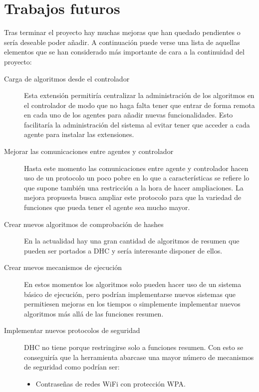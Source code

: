 \chapter{Trabajos futuros}\label{cap6}

Tras terminar el proyecto hay muchas mejoras que han quedado pendientes o sería deseable poder añadir. A continuación puede verse una lista de aquellas elementos que se han considerado más importante de cara a la continuidad del proyecto:

\begin{description}
	\item[Carga de algoritmos desde el controlador] Esta extensión permitiría centralizar la administración de los algoritmos en el controlador de modo que no haga falta tener que entrar de forma remota en cada uno de los agentes para añadir nuevas funcionalidades. Esto facilitaría la administración del sistema al evitar tener que acceder a cada agente para instalar las extensiones.

	\item[Mejorar las comunicaciones entre agentes y controlador] Hasta este momento las comunicaciones entre agente y controlador hacen uso de un protocolo un poco pobre en lo que a características se refiere lo que supone también una restricción a la hora de hacer ampliaciones. La mejora propuesta busca ampliar este protocolo para que la variedad de funciones que pueda tener el agente sea mucho mayor.

	\item[Crear nuevos algoritmos de comprobación de hashes] En la actualidad hay una gran cantidad de algoritmos de resumen que pueden ser portados a  DHC y sería interesante disponer de ellos.
	
	\item[Crear nuevos mecanismos de ejecución] En estos momentos los algoritmos solo pueden hacer uso de un sistema básico de ejecución, pero podrían implementarse nuevos sistemas que permitiesen mejoras en los tiempos o simplemente implementar nuevos algoritmos más allá de las funciones resumen.
	
	\item[Implementar nuevos protocolos de seguridad] DHC no tiene porque restringirse solo a funciones resumen. Con esto se conseguiría que la herramienta abarcase una mayor número de mecanismos de seguridad como  podrían ser:
	
	\begin{itemize}
		\item Contraseñas de redes WiFi con protección WPA.
		

\end{itemize}
\end{description}
